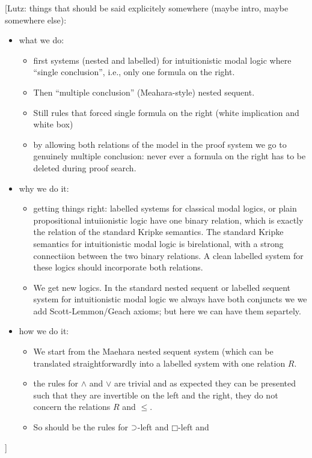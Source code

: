 \documentclass[a4paper]{article}
\theoremstyle{plain}
\theoremstyle{definition}
\newcommand{\lutz}[1]{{\color{notgreen}[Lutz: #1]}}
\newcommand*{\AND}{\mathbin{\wedge}}
\newcommand*{\OR}{\mathbin{\vee}}
\newcommand*{\IMP}{\mathbin{\scalebox{.9}{\raise.2ex\hbox{$\supset$}}}}
\newcommand*{\BOX}{\mathord{\Box}}
\begin{document}
\lutz{things that should be said explicitely somewhere (maybe intro, maybe somewhere else):
  \begin{itemize}
  \item what we do:
    \begin{itemize}
    \item first systems (nested and labelled) for intuitionistic modal
      logic where ``single conclusion'', i.e., only one formula on the
      right.
    \item Then ``multiple conclusion'' (Meahara-style) nested sequent.
    \item Still rules that forced single formula on the right (white implication and white box)
    \item by allowing both relations of the model in the proof system
      we go to genuinely multiple conclusion: never ever a formula on
      the right has to be deleted during proof search.
    \end{itemize}
  \item why we do it: 
    \begin{itemize}
    \item getting things right: labelled systems for classical modal
      logics, or plain propositional intuiionistic logic have one
      binary relation, which is exactly the relation of the standard
      Kripke semantics. The standard Kripke semantics for
      intuitionistic modal logic is birelational, with a strong
      connectiion between the two binary relations. A clean labelled
      system for these logics should incorporate both relations.
    \item We get new logics.  In the standard nested sequent
      or labelled sequent system for intuitionistic modal logic we
      always have both conjuncts we we add Scott-Lemmon/Geach axioms;
      but here we can have them separtely.
    \end{itemize}
  \item how we do it:
    \begin{itemize}
    \item We start from the Maehara nested sequent system (which can
      be translated straightforwardly into a labelled system with one
      relation $R$.
    \item the rules for $\AND$ and $\OR$ are trivial and as expected
      they can be presented such that they are invertible on the left
      and the right, they do not concern the relations $R$ and $\le$. 
    \item So should be the rules for $\IMP$-left and $\BOX$-left and

\end{itemize}
\end{itemize}}
\end{document}
